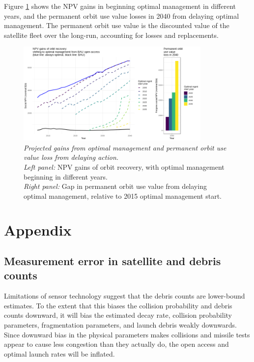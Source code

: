\documentclass[12pt]{article}
\begin{document}
Figure \ref{costs_of_inaction} shows the NPV gains in beginning optimal management in different years, and the permanent orbit use value losses in 2040 from delaying optimal management. The permanent orbit use value is the discounted value of the satellite fleet over the long-run, accounting for losses and replacements.

\begin{figure}[H]
	\centering
	\includegraphics[width=0.85\textwidth]{../../images/costs_of_inaction_2006_remfrac_0_remstart_2025.png}
	\captionsetup{format=hang}
	\caption[Permanent orbit use value loss from delaying action]{\textit{Projected gains from optimal management and permanent orbit use value loss from delaying action.} \\
		\textit{Left panel:} NPV gains of orbit recovery, with optimal management beginning in different years. \\
		\textit{Right panel:} Gap in permanent orbit use value from delaying optimal management, relative to 2015 optimal management start. \\
	}
	\label{costs_of_inaction}
\end{figure}

\newpage

{
	\setlength{\bibsep}{3pt}
	
	
}

\newpage

\section{Appendix}

\subsection{Measurement error in satellite and debris counts}
\label{physicsMeasurementError}

Limitations of sensor technology suggest that the debris counts are lower-bound estimates. To the extent that this biases the collision probability and debris counts downward, it will bias the estimated decay rate, collision probability parameters, fragmentation parameters, and launch debris weakly downwards. Since downward bias in the physical parameters makes collisions and missile tests appear to cause less congestion than they actually do, the open access and optimal launch rates will be inflated.\\
\end{document}
